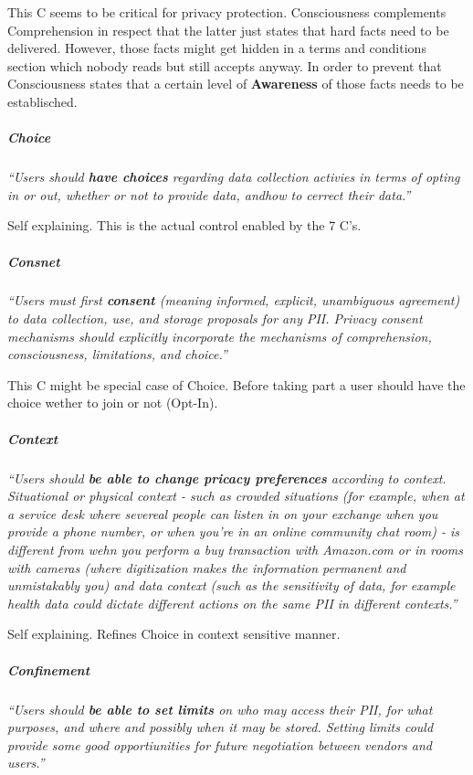 This C seems to be critical for privacy protection. Consciousness
complements Comprehension in respect that the latter just states that
hard facts need to be delivered. However, those facts might get hidden
in a terms and conditions section which nobody reads but still accepts
anyway. In order to prevent that Consciousness states that a certain
level of \textbf{Awareness} of those facts needs to be establisched.

\subparagraph{Choice}

\emph{``Users should \textbf{have choices} regarding data collection
activies in terms of opting in or out, whether or not to provide data,
andhow to cerrect their data.''}

Self explaining. This is the actual control enabled by the 7 C's.

\subparagraph{Consnet}

\emph{``Users must first \textbf{consent} (meaning informed, explicit,
unambiguous agreement) to data collection, use, and storage proposals
for any PII. Privacy consent mechanisms should explicitly incorporate
the mechanisms of comprehension, consciousness, limitations, and
choice.''}

This C might be special case of Choice. Before taking part a user should
have the choice wether to join or not (Opt-In).

\subparagraph{Context}

\emph{``Users should \textbf{be able to change pricacy preferences}
according to context. Situational or physical context - such as crowded
situations (for example, when at a service desk where severeal people
can listen in on your exchange when you provide a phone number, or when
you're in an online community chat room) - is different from wehn you
perform a buy transaction with Amazon.com or in rooms with cameras
(where digitization makes the information permanent and unmistakably
you) and data context (such as the sensitivity of data, for example
health data could dictate different actions on the same PII in different
contexts.''}

Self explaining. Refines Choice in context sensitive manner.

\subparagraph{Confinement}

\emph{``Users should \textbf{be able to set limits} on who may access
their PII, for what purposes, and where and possibly when it may be
stored. Setting limits could provide some good opportiunities for future
negotiation between vendors and users.''}

